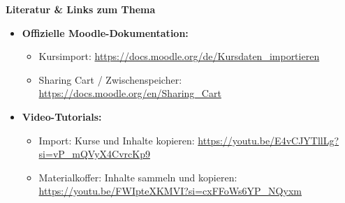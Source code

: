 \documentclass{article}
\newlength{\commonwidth}
\begin{document}
\begin{center}
\begin{minipage}{\commonwidth}
\begin{mdframed}[
    backgroundcolor=lightgray, 
    linewidth=0pt, 
    roundcorner=5pt,
    innerleftmargin=1em,
    innerrightmargin=1em,
    innertopmargin=0.7em,
    innerbottommargin=0.7em
]
\raggedright %
\textbf{\textcolor{customred}{Literatur \& Links zum Thema}}
\vspace{0.2cm}

\begin{itemize}
\item \textbf{Offizielle Moodle-Dokumentation:}
\vspace{0.2cm}
  \begin{itemize}
  \item Kursimport: \url{https://docs.moodle.org/de/Kursdaten_importieren}
  \item Sharing Cart / Zwischenspeicher: \url{https://docs.moodle.org/en/Sharing_Cart}
  \end{itemize}
\vspace{0.5cm}

\item \textbf{Video-Tutorials:}
\vspace{0.2cm}
  \begin{itemize}
  \item Import: Kurse und Inhalte kopieren: \url{https://youtu.be/E4vCJYTllLg?si=vP_mQVyX4CvrcKp9}
  \item Materialkoffer: Inhalte sammeln und kopieren: \url{https://youtu.be/FWIpteXKMVI?si=cxFFoWs6YP_NQyxm}
  \end{itemize}
\end{itemize}
\end{mdframed}
\end{minipage}
\end{center}

\vspace{1cm}
\end{document}
